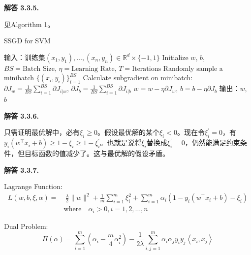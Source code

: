 \documentclass[12pt, a4paper, oneside]{ctexart}
\newenvironment{solution}[1]{\par\noindent\textbf{解答 #1. }\par}{\par}
\begin{document}
\begin{solution}{3.3.5}
    见Algorithm 1。
    \begin{algorithm}[htbp]
        \caption{SSGD for SVM}
        \begin{algorithmic}[width=0.8\textwidth]
            \State 输入：训练集$(x_1, y_1), \dots, (x_n, y_n) \in \mathbb{R}^d \times \{-1, 1\}$
            \State Initialize $w$, $b$, $BS=\text{Batch Size}$, $\eta = \text{Learning Rate}$, $T = \text{Iterations}$
                \State Randomly sample a minibatch $\{(x_i, y_i)\}_{i=1}^{BS}$
                \State Calculate subgradient on minibatch:
                \State $\partial J_w = \frac{1}{BS} \sum_{i=1}^{BS} \partial J_{i|w}$, $\partial J_b = \frac{1}{BS} \sum_{i=1}^{BS} \partial J_{i|b}$
                \State $w = w - \eta \partial J_w$, $b = b - \eta \partial J_b$
            \EndFor
            \State 输出：$w$, $b$
        \end{algorithmic}
    \end{algorithm}
\end{solution}

\begin{solution}{3.3.6}
    只需证明最优解中，必有$\xi_i \geq 0$。假设最优解的某个$\xi_i < 0$。现在令$\xi_i^\prime = 0$，有$y_i(w^\top x_i + b) \geq 1 - \xi_i \geq 1 - \xi_i^\prime$。也就是说将$\xi_i$替换成$\xi_i^\prime = 0$，仍然能满足约束条件，但目标函数的值减少了。这与最优解的假设矛盾。
\end{solution}

\begin{solution}{3.3.7}
    Lagrange Function: 
    \begin{align}
        L(w, b, \xi, \alpha) = & \ \frac{\lambda}{2} \| w \|^2 + \frac{1}{m} \sum_{i=1}^{m} \xi_i^2 + \sum_{i=1}^{m} \alpha_i (1 - y_i(w^\top x_i + b) - \xi_i) \nonumber \\
        & \text{where}\quad  \alpha_i > 0, i = 1, 2, \dots, n \nonumber
    \end{align} \par
    Dual Problem:
    \begin{equation}
        \Pi(\alpha) = \sum_{i=1}^{m} (\alpha_i - \frac{m}{4}\alpha_i ^ 2) - \frac{1}{2\lambda}\sum_{i,j=1}^{m}\alpha_i \alpha_j y_i y_j \left< x_i, x_j\right> \nonumber
    \end{equation}
\end{solution}
\end{document}
